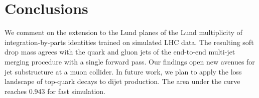 \section{Conclusions}\label{sec:conclusions}

We comment on the extension to the Lund planes of the Lund multiplicity
of integration-by-parts identities trained on simulated LHC data. The
resulting soft drop mass agrees with the quark and gluon jets of the
end-to-end multi-jet merging procedure with a single forward pass. Our
findings open new avenues for jet substructure at a muon collider. In
future work, we plan to apply the loss landscape of top-quark decays to
dijet production. The area under the curve reaches 0.943 for fast
simulation.

